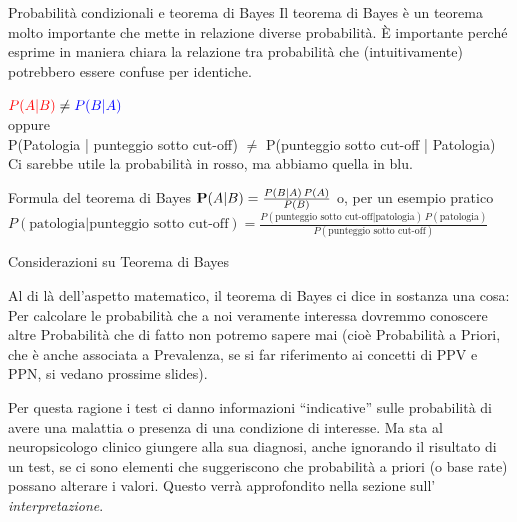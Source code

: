 \documentclass[
  ignorenonframetext,
  aspectratio=169,
]{beamer}
\begin{document}
\begin{frame}{Probabilità condizionali e teorema di Bayes}
\label{probabilituxe0-condizionali-e-teorema-di-bayes}
Il teorema di Bayes è un teorema molto importante che mette in relazione
diverse probabilità. È importante perché esprime in maniera chiara la
relazione tra probabilità che (intuitivamente) potrebbero essere confuse
per identiche.

\vfill
\center
${\color{red} P(A|B)}\neq {\color{blue} P(B|A)}$\\
\vspace{1em}
oppure \\
\scriptsize
\vspace{1em}
{\color{red}P(Patologia | punteggio sotto cut-off)} $\neq$ {\color{blue}P(punteggio sotto cut-off | Patologia)}\\
\vspace{1em}
Ci sarebbe utile la probabilità in rosso, ma abbiamo quella in blu.
\end{frame}

\begin{frame}{Formula del teorema di Bayes}
\label{formula-del-teorema-di-bayes}
\center
$\textbf P(A | B) = \frac{P(B | A)\,P(A)}{P(B)}$
\vfill
o, per un esempio pratico
\vfill
\scriptsize
$P(\text{patologia} | \text{punteggio sotto cut-off}) = \frac{P(\text{punteggio sotto cut-off} | \text{patologia})\,P(\text{patologia})}{P(\text{punteggio sotto cut-off})}$
\end{frame}

\begin{frame}{Considerazioni su Teorema di Bayes}
\label{considerazioni-su-teorema-di-bayes}
\small

Al di là dell'aspetto matematico, il teorema di Bayes ci dice in
sostanza una cosa: Per calcolare le probabilità che a noi veramente
interessa dovremmo conoscere altre Probabilità che di fatto non potremo
sapere mai (cioè Probabilità a Priori, che è anche associata a
Prevalenza, se si far riferimento ai concetti di PPV e PPN, si vedano
prossime slides).

Per questa ragione i test ci danno informazioni ``indicative'' sulle
probabilità di avere una malattia o presenza di una condizione di
interesse. Ma sta al neuropsicologo clinico giungere alla sua diagnosi,
anche ignorando il risultato di un test, se ci sono elementi che
suggeriscono che probabilità a priori (o base rate) possano alterare i
valori. Questo verrà approfondito nella sezione sull'
\emph{interpretazione}.
\end{frame}
\end{document}
